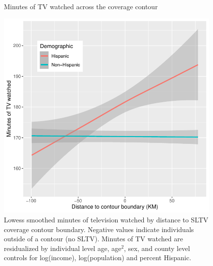 \documentclass[11pt]{article}
\begin{document}
\begin{figure}[!hbtp]
\centering
\caption{Minutes of TV watched across the coverage contour}\label{f:atus}
\includegraphics[width=14.5cm]{../../analysis/Output/graphs/atus.pdf}
\caption*{Lowess smoothed minutes of television watched by distance to SLTV coverage contour boundary. Negative values indicate individuals outside of a contour (no SLTV). Minutes of TV watched are residualized by individual level age, age$^2$, sex, and county level controls for log(income), log(population) and percent Hispanic. }
\end{figure} 


\clearpage
\end{document}
